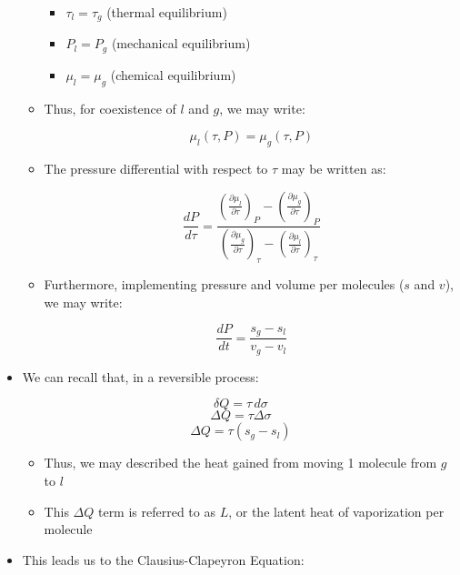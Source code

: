 \begin{itemize}
\begin{itemize}
        \begin{itemize}

          \item $\tau_l=\tau_g$ (thermal equilibrium)

          \item $P_l=P_g$ (mechanical equilibrium)

          \item $\mu_l=\mu_g$ (chemical equilibrium)

        \end{itemize}

      \item Thus, for coexistence of $l$ and $g$, we may write:

        $$\mu_l(\tau,P)=\mu_g(\tau,P)$$

      \item The pressure differential with respect to $\tau$ may be written as:

        $$\frac{dP}{d\tau}=\frac{\left( \frac{\partial\mu_l}{\partial\tau} \right)_P-\left( \frac{\partial\mu_g}{\partial\tau} \right)_P}{\left( \frac{\partial\mu_g}{\partial\tau} \right)_\tau-\left( \frac{\partial\mu_l}{\partial\tau} \right)_\tau}$$

      \item Furthermore, implementing pressure and volume per molecules ($s$ and $v$), we may write:

        $$\frac{dP}{dt}=\frac{s_g-s_l}{v_g-v_l}$$

    \end{itemize}

  \item We can recall that, in a reversible process:

    $$\delta Q=\tau\,d\sigma$$
    $$\Delta Q=\tau\Delta\sigma$$
    $$\Delta Q=\tau(s_g-s_l)$$

    \begin{itemize}

      \item Thus, we may described the heat gained from moving 1 molecule from $g$ to $l$

      \item This $\Delta Q$ term is referred to as $L$, or the latent heat of vaporization per molecule

    \end{itemize}

  \item This leads us to the Clausius-Clapeyron Equation:


\end{itemize}
